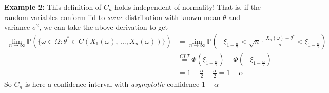 \documentclass[12pt]{article}
\renewcommand{\P}{\mathbb{P}}
\begin{document}
\textbf{Example 2:} This definition of $C_n$ holds independent of normality! That is, if the random variables conform iid to \emph{some} distribution with known mean $\theta$ and variance $\sigma^2$, we can take the above derivation to get  
\begin{align*}
    \lim_{n \to \infty} \P\left(\{\omega \in \Omega: \theta^* \in C(X_1(\omega),\, ..., X_n(\omega))\}\right) &= \lim_{n \to \infty} \P\left(-\xi_{1 - \frac{\alpha}{2}} < \sqrt{n} \cdot \frac{\bar X_n(\omega) - \theta^*}{\sigma} < \xi_{1 - \frac{\alpha}{2}}\right)\\
    &\overset{CLT}{=} \Phi(\xi_{1 - \frac{\alpha}{2}}) - \Phi(-\xi_{1 - \frac{\alpha}{2}})\\
    &= 1 - \frac{\alpha}{2} - \frac{\alpha}{2} = \boxed{1 - \alpha}
\end{align*}
So $C_n$ is here a confidence interval with \emph{asymptotic} confidence $1- \alpha$
\end{document}
